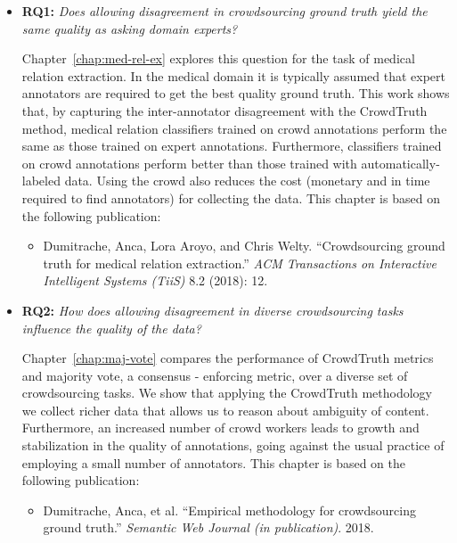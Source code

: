 \begin{itemize}
    \item \textbf{RQ1:} \textit{Does allowing disagreement in crowdsourcing ground truth yield the same quality as asking domain experts?}
    
    Chapter~\ref{chap:med-rel-ex} explores this question for the task of medical relation extraction. In the medical domain it is typically assumed that expert annotators are required to get the best quality ground truth. This work shows that, by capturing the inter-annotator disagreement with the CrowdTruth method, medical relation classifiers trained on crowd annotations perform the same as those trained on expert annotations. Furthermore, classifiers trained on crowd annotations perform better than those trained with automatically-labeled data. Using the crowd also reduces the cost (monetary and in time required to find annotators) for collecting the data. This chapter is based on the following publication:
    
    \begin{itemize}
        \item Dumitrache, Anca, Lora Aroyo, and Chris Welty. ``Crowdsourcing ground truth for medical relation extraction.'' \textit{ACM Transactions on Interactive Intelligent Systems (TiiS)} 8.2 (2018): 12.~\cite{DBLP:journals/corr/DumitracheAW17}
    \end{itemize}

    \item \textbf{RQ2:} \textit{How does allowing disagreement in diverse crowdsourcing tasks influence the quality of the data?}
    
    Chapter~\ref{chap:maj-vote} compares the performance of CrowdTruth metrics and majority vote, a consensus - enforcing metric, over a diverse set of crowdsourcing tasks. We show that applying the CrowdTruth methodology we collect richer data that allows us to reason about ambiguity of content. Furthermore, an increased number of crowd workers leads to growth and stabilization in the quality of annotations, going against the usual practice of employing a small number of annotators. This chapter is based on the following publication:
    
    \begin{itemize}
        \item Dumitrache, Anca, et al. ``Empirical methodology for crowdsourcing ground truth.'' \textit{Semantic Web Journal (in publication)}. 2018.~\cite{dumitracheempirical}
    \end{itemize}


\end{itemize}
